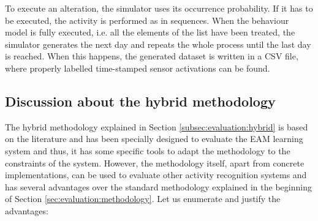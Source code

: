 To execute an alteration, the simulator uses its occurrence probability. If it has to be executed, the activity is performed as in sequences. When the behaviour model is fully executed, i.e. all the elements of the list have been treated, the simulator generates the next day and repeats the whole process until the last day is reached. When this happens, the generated dataset is written in a CSV file, where properly labelled time-stamped sensor activations can be found.

\subsection{Discussion about the hybrid methodology}
\label{subsec:evaluation:hybrid:discussion}
\begin{comment}
- Explain the advantages: generate virtually infinite datasets, arbitrary number of days, perfectly labelled, sensor noise, erratic behaviour, realistic time lapses
 - Explain the main disadvantages: erratic behaviour difficult to capture
 \end{comment}
The hybrid methodology explained in Section \ref{subsec:evaluation:hybrid} is based on the literature and has been specially designed to evaluate the EAM learning system and thus, it has some specific tools to adapt the methodology to the constraints of the system. However, the methodology itself, apart from concrete implementations, can be used to evaluate other activity recognition systems and has several advantages over the standard methodology explained in the beginning of Section \ref{sec:evaluation:methodology}. Let us enumerate and justify the advantages:

